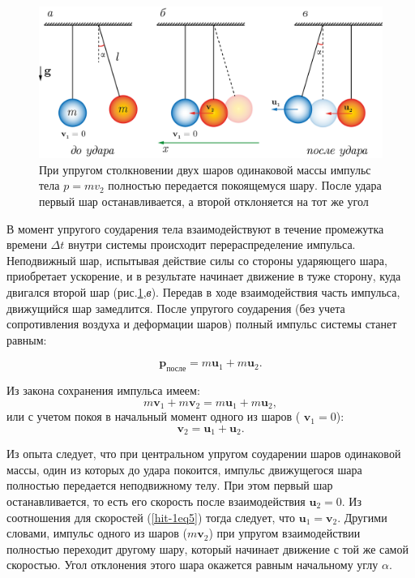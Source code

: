 \documentclass[14pt,a4paper,oneside]{extarticle}	%
\begin{document}
\begin{figure}[H]
	\centering 	
	\includegraphics[width=0.9\linewidth]{hit-4.png}
	\caption{При упругом столкновении двух шаров одинаковой массы импульс тела $ p=mv_2 $ полностью передается покоящемуся шару. После удара первый шар останавливается, а второй отклоняется на тот же угол}
	\label{hit-4}
\end{figure}

В момент упругого соударения тела взаимодействуют в течение промежутка времени $ \Delta t $ внутри системы происходит перераспределение импульса.
Неподвижный шар, испытывая действие силы со стороны ударяющего шара, приобретает ускорение, и в результате начинает движение в туже сторону, куда двигался второй шар (рис.\ref{hit-4},\textit{в}).
Передав в ходе взаимодействия часть импульса, движущийся шар замедлится.
После упругого соударения (без учета сопротивления воздуха и деформации шаров) полный импульс системы станет равным:

	\begin{equation}\label{hit-1eq3}
\textbf{p}_{\text{после}}  = m \textbf{u}_1 + m \textbf{u}_2.
\end{equation}

Из закона сохранения импульса имеем:
	\begin{equation}\label{hit-1eq4}
m \textbf{v}_1 + m \textbf{v}_2  = m \textbf{u}_1 + m \textbf{u}_2,
\end{equation}
или с учетом покоя в начальный момент одного из шаров ( $ \textbf{v}_1=0 $):
	\begin{equation}\label{hit-1eq5}
\textbf{v}_2  = \textbf{u}_1 + \textbf{u}_2.
\end{equation}

Из опыта следует, что при центральном упругом соударении шаров одинаковой массы, один из которых до удара покоится, импульс движущегося шара полностью передается неподвижному телу.
При этом первый шар останавливается, то есть его скорость после взаимодействия $ \textbf{u}_2=0 $.  
Из соотношения для скоростей (\ref{hit-1eq5}) тогда следует, что $ \textbf{u}_1  = \textbf{v}_2 $.
Другими словами, импульс одного из шаров ($ m\textbf{v}_2 $) при упругом взаимодействии полностью переходит другому шару, который начинает движение с той же самой скоростью.
Угол отклонения этого шара окажется равным начальному углу $ \alpha $.
\end{document}
